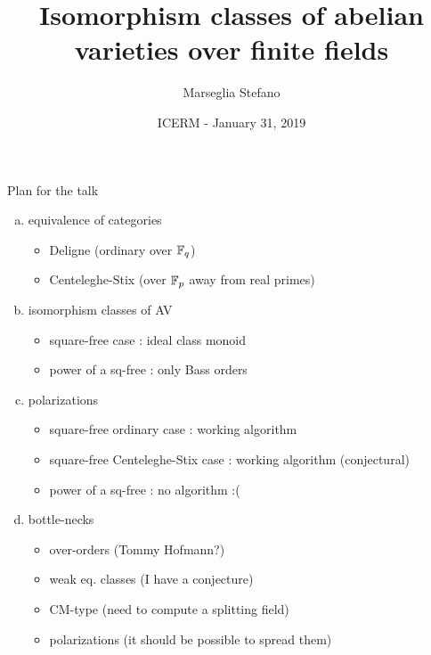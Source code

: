 \documentclass[usenames,dvipsnames]{beamer}
\title[]{Isomorphism classes of abelian varieties over finite fields}
\subtitle{}
\author[Marseglia Stefano]{Marseglia Stefano}
\institute[]{Utrecht University}
\date{ICERM - January 31, 2019}
\begin{document}
\begin{frame}
\titlepage
\end{frame}

\begin{frame}{ Plan for the talk }
\begin{enumerate}[(a)]
 \pause \item equivalence of categories
       \begin{itemize}
        \item Deligne (ordinary over $\mathbb{F}_q$)
        \item Centeleghe-Stix (over $\mathbb{F}_p$ away from real primes)
       \end{itemize}
 \pause \item isomorphism classes of AV
       \begin{itemize}
        \item square-free case : ideal class monoid
        \item power of a sq-free : only Bass orders
       \end{itemize}
 \pause \item polarizations
       \begin{itemize}
        \item square-free ordinary case : working algorithm
        \item square-free Centeleghe-Stix case : working algorithm (conjectural)
        \item power of a sq-free : no algorithm :(
       \end{itemize}
 \pause \item bottle-necks
       \begin{itemize}
        \item over-orders (Tommy Hofmann?)
        \item weak eq. classes (I have a conjecture)
        \item CM-type (need to compute a splitting field)
        	\item polarizations (it should be possible to spread them)
       \end{itemize}
\end{enumerate}
\end{frame}
\end{document}
